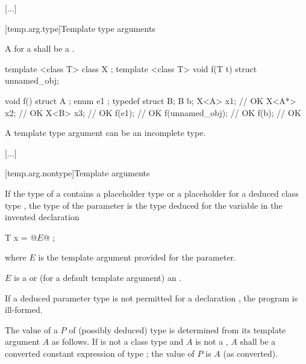 \documentclass{wg21}
\begin{document}
\textcolor{noteclr}{[...]}

[temp.arg.type]{Template type arguments}

\pnum
A  for a  shall be a .

\pnum
\begin{example}
    \begin{codeblock}
        template <class T> class X { };
        template <class T> void f(T t) { }
        struct { } unnamed_obj;

        void f() {
            struct A { };
            enum { e1 };
            typedef struct { } B;
            B b;
            X<A> x1;          // OK
            X<A*> x2;         // OK
            X<B> x3;          // OK
            f(e1);            // OK
            f(unnamed_obj);   // OK
            f(b);             // OK
        }
    \end{codeblock}
\end{example}
\begin{note}
A template type argument can be an incomplete type.
\end{note}

\textcolor{noteclr}{[...]}

[temp.arg.nontype]{Template  arguments}

\pnum
If the type  of a  
contains a placeholder type 
or a placeholder for a deduced class type ,
the type of the parameter is the type deduced
for the variable  in the invented declaration
\begin{codeblock}
    T x = @$E$@ ;
\end{codeblock}
where $E$ is the template argument provided for the parameter.
\begin{note}
    $E$ is a  or
    (for a default template argument) an .
\end{note}
If a deduced parameter type is not permitted
for a  declaration ,
the program is ill-formed.

\pnum
The value of a   $P$
of (possibly deduced) type 
is determined from its template argument $A$ as follows.
If  is not a class type and
$A$ is not a ,
$A$ shall be a converted constant expression 
of type ; the value of $P$ is $A$ (as converted).
\end{document}
